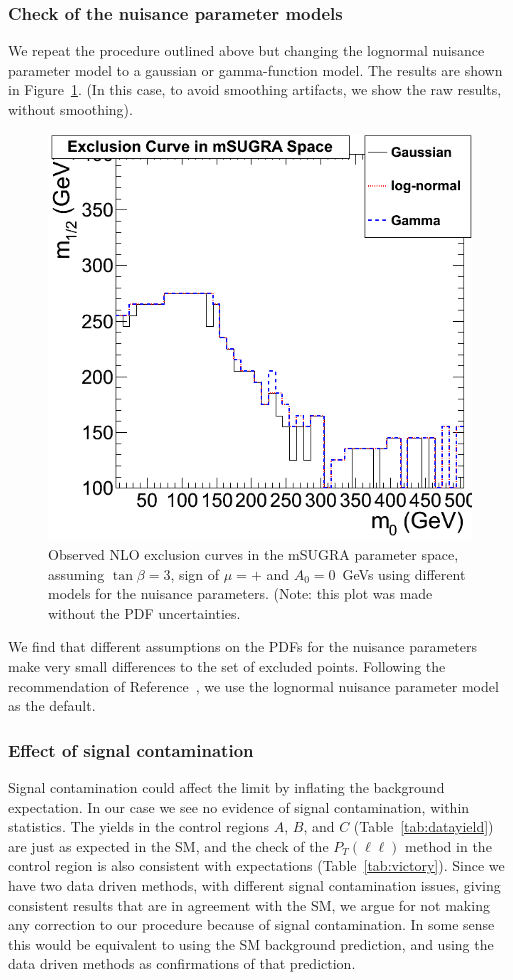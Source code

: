 \clearpage

\subsubsection{Check of the nuisance parameter models}
We repeat the procedure outlined above but changing the 
lognormal nuisance parameter model to a gaussian or 
gamma-function model.  The results are shown in 
Figure~\ref{fig:nuisance}.  (In this case,
to avoid smoothing artifacts, we 
show the raw results, without smoothing).

\begin{figure}[tbh]
\begin{center}
\includegraphics[width=0.5\linewidth]{nuissance.png}
\caption{\label{fig:nuisance}\protect Observed NLO exclusion curves in the 
mSUGRA parameter space, 
assuming $\tan\beta=3$, sign of $\mu = +$ and $A_{0}=0$~GeVs
using different models for the nuisance parameters. (Note: this
plot was made without the PDF uncertainties.}
\end{center}
\end{figure}

We find that different assumptions on the PDFs for the nuisance
parameters make very small differences to the set of excluded
points.
Following the recommendation of Reference~\cite{ref:cousins},
we use the lognormal nuisance parameter model as the default.




\subsubsection{Effect of signal contamination}
\label{sec:contlimit}

Signal contamination could affect the limit by inflating the 
background expectation.  In our case we see no evidence of signal
contamination, within statistics.
The yields in the control regions  
$A$, $B$, and $C$ (Table~\ref{tab:datayield}) are just 
as expected in the SM, and the check 
of the $P_T(\ell \ell)$ method in the control region is
also consistent with expectations (Table~\ref{tab:victory}).
Since we have two data driven methods, with different 
signal contamination issues, giving consistent
results that are in agreement with the SM, we 
argue for not making any correction to our procedure
because of signal contamination.  In some sense this would 
be equivalent to using the SM background prediction, and using 
the data driven methods as confirmations of that prediction.

